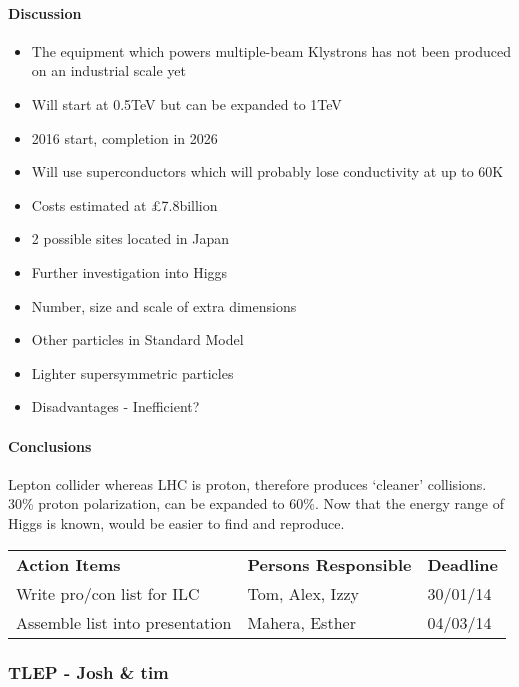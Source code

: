 \paragraph{Discussion}
\begin{itemize}
\item  The equipment which powers multiple-beam Klystrons has not been produced on an industrial scale yet
\item Will start at 0.5TeV but can be expanded to 1TeV
\item 2016 start, completion in 2026
\item Will use superconductors which will probably lose conductivity at up to 60K
\item Costs estimated at £7.8billion
\item 2 possible sites located in Japan

\item Further investigation into Higgs
\item Number, size and scale of extra dimensions
\item Other particles in Standard Model
\item Lighter supersymmetric particles
\item Disadvantages - Inefficient?
\end{itemize}

\paragraph{Conclusions}
Lepton collider whereas LHC is proton, therefore produces ‘cleaner’ collisions. 30\% proton polarization, can be expanded to 60\%.
Now that the energy range of Higgs is known, would be easier to find and reproduce.


\begin{tabularx}{\textwidth}{X p{4.5cm} p{1.2cm}}
  \textbf{Action Items} & \textbf{Persons Responsible} & \textbf{Deadline} \\
  Write pro/con list for ILC & Tom, Alex, Izzy & 30/01/14 \\
  Assemble list into presentation & Mahera, Esther & 04/03/14 \\
\end{tabularx}

\subsubsection{TLEP - Josh \& tim}

